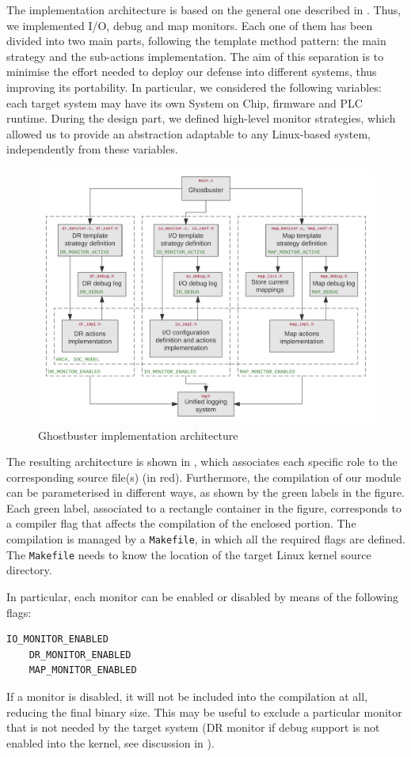 The implementation architecture is based on the general one described in . Thus, we implemented I/O, debug and map monitors.
Each one of them has been divided into two main parts, following the template method pattern: the main strategy and the sub-actions implementation.
The aim of this separation is to minimise the effort needed to deploy our defense into different systems, thus improving its portability.
In particular, we considered the following variables: each target system may have its own System on Chip, firmware and PLC runtime.
During the design part, we defined high-level monitor strategies, which allowed us to provide an abstraction adaptable to any Linux-based system,
independently from these variables.
\begin{figure}[h]
\centerline{\includegraphics[width=\textwidth]{res/def_impl}}
\caption{Ghostbuster implementation architecture \label{fig:def_impl}}
\end{figure}
The resulting architecture is shown in , which associates each specific role to the corresponding
source file(s) (in red).
Furthermore, the compilation of our module can be parameterised in different ways, as shown by the green labels in the figure.
Each green label, associated to a rectangle container in the figure, corresponds to a compiler flag that affects the compilation of the enclosed portion.
The compilation is managed by a \verb|Makefile|, in which all the required flags are defined.
The \verb|Makefile| needs to know the location of the target Linux kernel source directory.

In particular, each monitor can be enabled or disabled by means of the following flags:
\begin{Verbatim}[fontsize=\small]
	IO_MONITOR_ENABLED
	DR_MONITOR_ENABLED
	MAP_MONITOR_ENABLED
\end{Verbatim}
If a monitor is disabled, it will not be included into the compilation at all, reducing the final binary size.
This may be useful to exclude a particular monitor that is not needed by the target system
(\eg DR monitor if debug support is not enabled into the kernel, see discussion in ).

